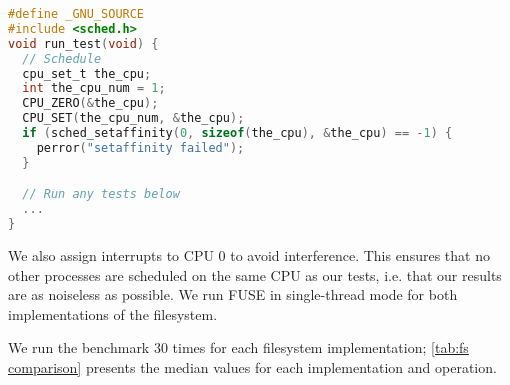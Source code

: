 \begin{lstlisting}[caption={Schedule a test on CPU 1}, label={code:schedule test}, language=C]
#define _GNU_SOURCE
#include <sched.h>
void run_test(void) {
  // Schedule
  cpu_set_t the_cpu;
  int the_cpu_num = 1;
  CPU_ZERO(&the_cpu);
  CPU_SET(the_cpu_num, &the_cpu);
  if (sched_setaffinity(0, sizeof(the_cpu), &the_cpu) == -1) {
    perror("setaffinity failed");
  }

  // Run any tests below
  ...
}
\end{lstlisting}
We also assign interrupts to CPU 0 to avoid interference.
This ensures that no other processes are scheduled on the same CPU as our tests, i.e. that our results are as noiseless as possible.
We run FUSE in single-thread mode for both implementations of the filesystem.

We run the benchmark 30 times for each filesystem implementation; \autoref{tab:fs comparison} presents the median values for each implementation and operation.

